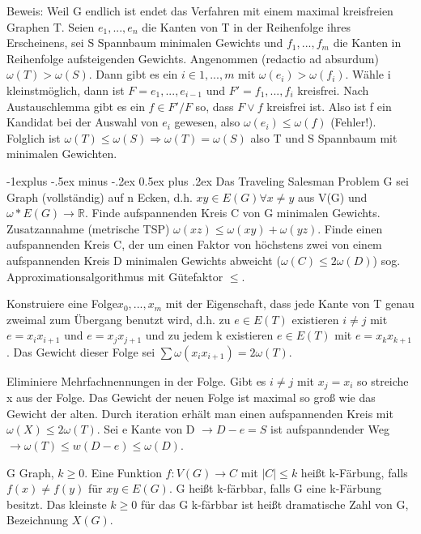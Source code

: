 \documentclass[a4paper]{article}
\makeatletter
\renewcommand{\subsection}{\@startsection{subsection}{2}{0mm}%
                                {-1explus -.5ex minus -.2ex}%
                                {0.5ex plus .2ex}%
                                {\normalfont\normalsize\bfseries}}
\makeatother
\begin{document}
\begin{multicols}{3}
    Beweis: Weil G endlich ist endet das Verfahren mit einem maximal kreisfreien Graphen T. Seien $e_1,...,e_n$ die Kanten von T in der Reihenfolge ihres Erscheinens, sei S Spannbaum minimalen Gewichts und $f_1,...,f_m$ die Kanten in Reihenfolge aufsteigenden Gewichts. Angenommen (redactio ad absurdum) $\omega(T)>\omega(S)$. Dann gibt es ein $i\in{1,...,m}$ mit $\omega(e_i)>\omega(f_i)$. Wähle i kleinstmöglich, dann ist $F={e_1,...,e_{i-1}}$ und $F'={f_1,...,f_i}$ kreisfrei. Nach Austauschlemma gibt es ein $f\in F'/F$ so, dass $F\vee {f}$ kreisfrei ist. Also ist f ein Kandidat bei der Auswahl von $e_i$ gewesen, also $\omega(e_i)\leq \omega(f)$ (Fehler!). Folglich ist $\omega(T)\leq \omega(S) \Rightarrow \omega(T)=\omega(S)$ also T und S Spannbaum mit minimalen Gewichten.
    
    \subsection{Das Traveling Salesman Problem}
    G sei Graph (vollständig) auf n Ecken, d.h. $xy\in E(G) \forall x\not =y$ aus V(G) und $\omega*E(G)\rightarrow \mathbb{R}$. Finde aufspannenden Kreis C von G minimalen Gewichts. Zusatzannahme (metrische TSP) $\omega(xz)\leq \omega(xy)+\omega(yz)$. 
    Finde einen aufspannenden Kreis C, der um einen Faktor von höchstens zwei von einem aufspannenden Kreis D minimalen Gewichts abweicht ($\omega(C)\leq 2 \omega(D)$) sog. Approximationsalgorithmus mit Gütefaktor $\leq$.
    
    Konstruiere eine Folge$x_0,...,x_m$ mit der Eigenschaft, dass jede Kante von T genau zweimal zum Übergang benutzt wird, d.h. zu $e\in E(T)$ existieren $i\not = j$ mit $e=x_i x_{i+1}$ und $e=x_j x_{j+1}$ und zu jedem k existieren $e\in E(T)$ mit $e=x_k x_{k+1}$. Das Gewicht dieser Folge sei $\sum \omega(x_i x_{i+1})= 2\omega(T)$.
    
    Eliminiere Mehrfachnennungen in der Folge. Gibt es $i\not= j$ mit $x_j=x_i$ so streiche x aus der Folge. Das Gewicht der neuen Folge ist maximal so groß wie das Gewicht der alten. Durch iteration erhält man einen aufspannenden Kreis mit $\omega(X) \leq 2 \omega(T)$. Sei e Kante von D $\rightarrow D-e=S$ ist aufspanndender Weg $\rightarrow \omega(T) \leq w(D-e) \leq \omega (D)$.
    
    G Graph, $k\geq 0$. Eine Funktion $f:V(G)\rightarrow C$ mit $|C|\leq k$ heißt k-Färbung, falls $f(x)\not = f(y)$ für $xy\in E(G)$. G heißt k-färbbar, falls G eine k-Färbung besitzt. Das kleinste $k\geq 0$ für das G k-färbbar ist heißt dramatische Zahl von G, Bezeichnung $X(G)$.
    

\end{multicols}
\end{document}
